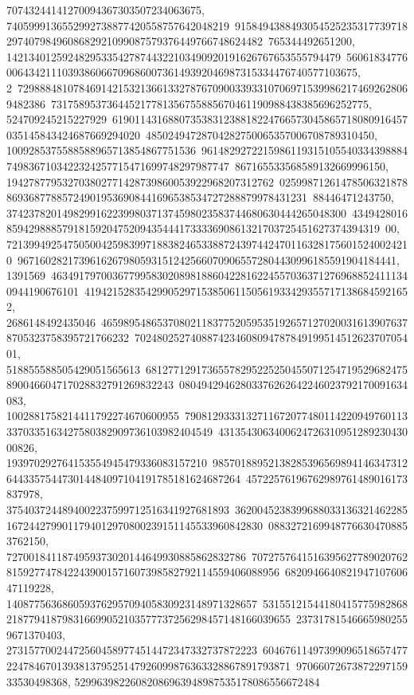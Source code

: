{{{70743244141270094367303507234063675, 7405999136552992738877420558757642048219\
91584943884930545252353177397182974079849608682921099087579376449766748624482\
765344492651200, 142134012592482953354278744322103490920191626767653555794479\
56061834776006434211103938606670968600736149392046987315334476740577103675, 2\
72988848107846914215321366133278767090033933107069715399862174692628069482386\
731758953736445217781356755885670461190988438385696252775, 524709245215227929\
61901143168807353831238818224766573045865718080916457035145843424687669294020\
48502494728704282750065357006708789310450, 1009285375588588965713854867751536\
96148292722159861193151055403343988847498367103422324257715471699748297987747\
867165533568589132669996150, 194278779532703802771428739860053922968207312762\
02599871261478506321878869368778857249019536908441696538534727288879978431231\
88446471243750, 3742378201498299162239980371374598023583744680630444265048300\
43494280168594298885791815920475209435444173333690861321703725451627374394319\
00, 7213994925475050042598399718838246533887243974424701163281756015240024210\
96716028217396162679805931512425660709065572804430996185591904184441, 1391569\
46349179700367799583020898188604228162245570363712769688524111340944190676101\
41942152835429905297153850611505619334293557171386845921652, 2686148492435046\
46598954865370802118377520595351926571270200316139076378705323758395721766232\
702480252740887423460809478784919951451262370705401, 518855588505429051565613\
68127712917365578295225250455071254719529682475890046604717028832791269832243\
08049429462803376262642246023792170091634083, 1002881758214411792274670600955\
79081293331327116720774801142209497601133370335163427580382909736103982404549\
431354306340062472631095128923043000826, 193970292764153554945479336083157210\
98570188952138285396569894146347312644335754473014484097104191785181624687264\
45722576196762989761489016173837978, 3754037244894002237599712516341927681893\
36200452383996880331363214622851672442799011794012970800239151145533960842830\
08832721699487766304708853762150, 7270018411874959373020144649930885862832786\
70727576415163956277890207628159277478422439001571607398582792114559406088956\
682094664082194710760647119228, 140877563686059376295709405830923148971328657\
53155121544180415775982868218779418798316699052103577737256298457148166039655\
237317815466659802559671370403, 273157700244725604589774514472347332737872223\
60467611497399096518657477224784670139381379525147926099876363328867891793871\
9706607267387229715933530498368, 52996398226082086963948987535178086556672484\
}}}
